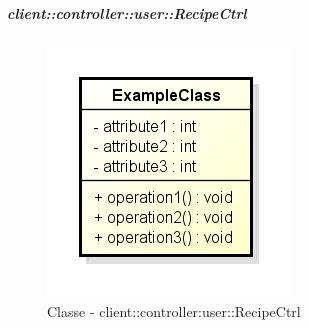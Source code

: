 		\subparagraph{client::controller::user::RecipeCtrl} %
		\label{subp:client_controller_user_recipectrl}
			\begin{figure}[htbp]
				\centering
				\centerline{\includegraphics[scale=0.7]{./images/client/classes/example_class.png}}
				\caption{Classe - client::controller:user::RecipeCtrl}
			\end{figure}
